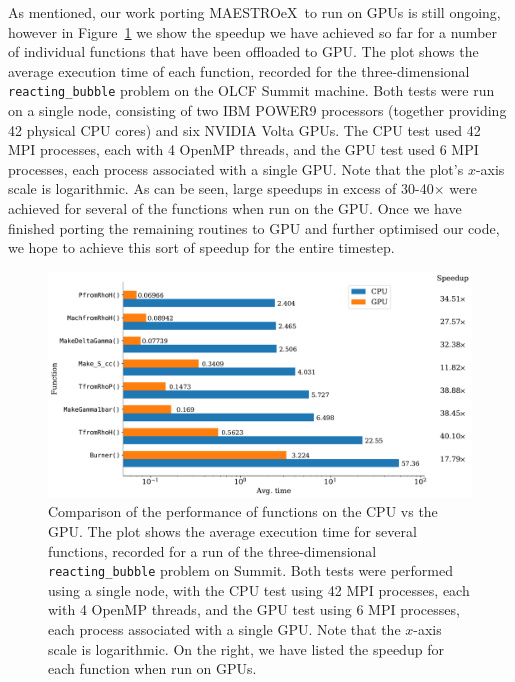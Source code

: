 \documentclass[a4paper]{jpconf}
\newcommand{\maestroex}{{\sffamily MAESTROeX}}
\begin{document}
As mentioned, our work porting \maestroex~to run on GPUs is still ongoing, however in Figure~\ref{fig:gpu_speedup} we show the speedup we have achieved so far for a number of individual functions that have been offloaded to GPU. The plot shows the average execution time of each function, recorded for the three-dimensional \texttt{reacting\_bubble} problem on the OLCF Summit machine. Both tests were run on a single node, consisting of two IBM POWER9 processors (together providing 42 physical CPU cores) and six NVIDIA Volta GPUs. The CPU test used 42 MPI processes, each with 4 OpenMP threads, and the GPU test used 6 MPI processes, each process associated with a single GPU. Note that the plot's $x$-axis scale is logarithmic. As can be seen, large speedups in excess of 30-40$\times$ were achieved for several of the functions when run on the GPU. Once we have finished porting the remaining routines to GPU and further optimised our code, we hope to achieve this sort of speedup for the entire timestep. 

\begin{figure}
    \centering
    \includegraphics[width=\textwidth]{plots/gpu_speedup}
    \caption{Comparison of the performance of functions on the CPU vs the GPU. The plot shows the average execution time for several functions, recorded for a run of the three-dimensional \texttt{reacting\_bubble} problem on Summit. Both tests were performed using a single node, with the CPU test using 42 MPI processes, each with 4 OpenMP threads, and the GPU test using 6 MPI processes, each process associated with a single GPU. Note that the $x$-axis scale is logarithmic. On the right, we have listed the speedup for each function when run on GPUs.}\label{fig:gpu_speedup}
\end{figure}

\end{document}
